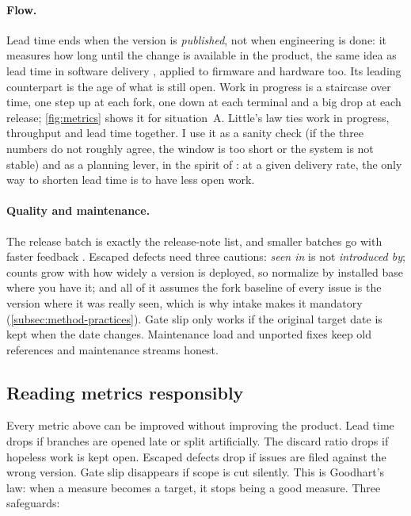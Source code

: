 \paragraph{Flow.}
Lead time ends when the version is \emph{published}, not when engineering
is done: it measures how long until the change is available in the
product, the same idea as lead time in software delivery
\citep{forsgren2018accelerate}, applied to firmware and hardware too. Its
leading counterpart is the age of what is still open. Work in progress is
a staircase over time, one step up at each fork, one down at each terminal
and a big drop at each release; \cref{fig:metrics} shows it for
situation~A. Little's law \citep{little1961} ties work in progress,
throughput and lead time together. I use it as a sanity check (if the
three numbers do not roughly agree, the window is too short or the system
is not stable) and as a planning lever, in the spirit of
\citet{reinertsen2009flow}: at a given delivery rate, the only way to
shorten lead time is to have less open work.



\paragraph{Quality and maintenance.}
The release batch is exactly the release-note list, and smaller batches go
with faster feedback \citep{reinertsen2009flow}. Escaped defects need three
cautions: \emph{seen in} is not \emph{introduced by}; counts grow with how
widely a version is deployed, so normalize by installed base where you
have it; and all of it assumes the fork baseline of every issue is the
version where it was really seen, which is why intake makes it mandatory
(\cref{subsec:method-practices}). Gate slip only works if the original
target date is kept when the date changes. Maintenance load and unported
fixes keep old references and maintenance streams honest.

\subsection{Reading metrics responsibly}
\label{subsec:metrics-goodhart}

Every metric above can be improved without improving the product. Lead
time drops if branches are opened late or split artificially. The discard
ratio drops if hopeless work is kept open. Escaped defects drop if issues
are filed against the wrong version. Gate slip disappears if scope is cut
silently. This is Goodhart's law: when a measure becomes a target, it stops
being a good measure. Three safeguards:

